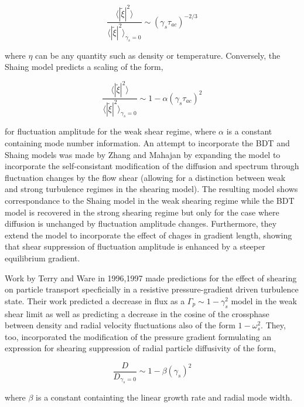 \documentclass[aip,pop,amsmath,amssymb,reprint,superscriptaddress]{revtex4-1} %
\begin{document}
\begin{equation}
\frac{\langle |\tilde{\xi}|^{2} \rangle}{\langle |\tilde{\xi}|^{2} \rangle_{\gamma_{s}=0}} \sim (\gamma_{s}\tau_{ac})^{-2/3}
\label{eq:BDT_theory}
\end{equation}

where $\eta$ can be any quantity such as density or temperature. Conversely, the Shaing model predicts a scaling of the form,

\begin{equation}
\frac{\langle |\tilde{\xi}|^{2} \rangle}{\langle |\tilde{\xi}|^{2} \rangle_{\gamma_{s}=0}} \sim 1- \alpha(\gamma_{s}\tau_{ac})^2
\label{eq:shaing_theory}
\end{equation}

for fluctuation amplitude for the weak shear regime, where $\alpha$ is a constant containing mode number information. An attempt to incorporate the BDT and Shaing models was made by Zhang and Mahajan by expanding the model to incorporate the self-consistant modification of the diffusion and spectrum through fluctuation changes by the flow shear (allowing for a distinction between weak and strong turbulence regimes in the shearing model). The resulting model shows correspondance to the Shaing model in the weak shearing regime while the BDT model is recovered in the strong shearing regime but only for the case where diffusion is unchanged by fluctuation amplitude changes. Furthermore, they extend the model to incorporate the effect of chages in gradient length, showing that shear suppression of fluctuation amplitude is enhanced by a steeper equilibrium gradient. 

Work by Terry and Ware in 1996,1997 made predictions for the effect of shearing on particle transport specficially in a resistive pressure-gradient driven turbulence state. Their work predicted a decrease in flux as a $\Gamma_{p} \sim 1-\gamma_{s}^2$ model in the weak shear limit as well as predicting a decrease in the cosine of the crossphase between density and radial velocity fluctuations also of the form $1-\omega_{s}^2$. They, too, incorporated the modification of the pressure gradient formulating an expression for shearing suppression of radial particle diffusivity of the form,

\begin{equation}
\frac{D}{D_{\gamma_{s}=0}} \sim 1-\beta(\gamma_{s})^2
\label{eq:ware_diff_theory}
\end{equation}

where $\beta$ is a constant containting the linear growth rate and radial mode width.
\end{document}

